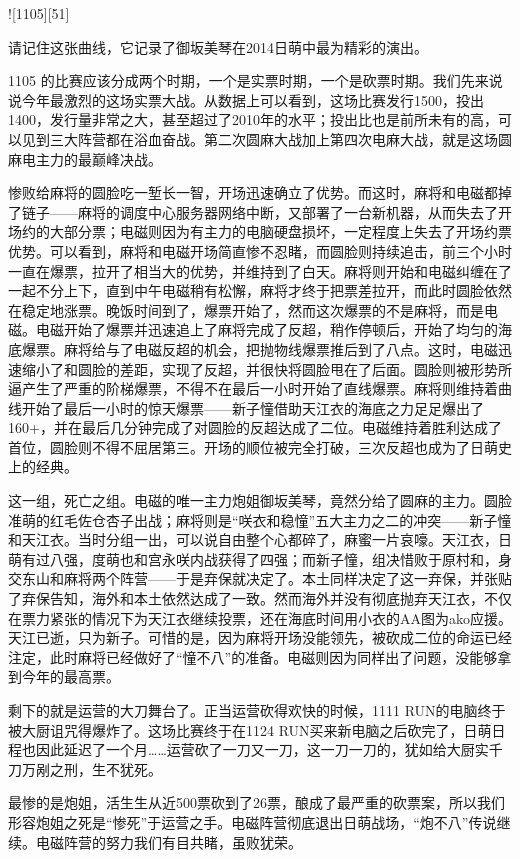 ![1105][51]

请记住这张曲线，它记录了御坂美琴在2014日萌中最为精彩的演出。

1105 的比赛应该分成两个时期，一个是实票时期，一个是砍票时期。我们先来说说今年最激烈的这场实票大战。从数据上可以看到，这场比赛发行1500，投出1400，发行量非常之大，甚至超过了2010年的水平；投出比也是前所未有的高，可以见到三大阵营都在浴血奋战。第二次圆麻大战加上第四次电麻大战，就是这场圆麻电主力的最巅峰决战。

惨败给麻将的圆脸吃一堑长一智，开场迅速确立了优势。而这时，麻将和电磁都掉了链子——麻将的调度中心服务器网络中断，又部署了一台新机器，从而失去了开场约的大部分票；电磁则因为有主力的电脑硬盘损坏，一定程度上失去了开场约票优势。可以看到，麻将和电磁开场简直惨不忍睹，而圆脸则持续追击，前三个小时一直在爆票，拉开了相当大的优势，并维持到了白天。麻将则开始和电磁纠缠在了一起不分上下，直到中午电磁稍有松懈，麻将才终于把票差拉开，而此时圆脸依然在稳定地涨票。晚饭时间到了，爆票开始了，然而这次爆票的不是麻将，而是电磁。电磁开始了爆票并迅速追上了麻将完成了反超，稍作停顿后，开始了均匀的海底爆票。麻将给与了电磁反超的机会，把抛物线爆票推后到了八点。这时，电磁迅速缩小了和圆脸的差距，实现了反超，并很快将圆脸甩在了后面。圆脸则被形势所逼产生了严重的阶梯爆票，不得不在最后一小时开始了直线爆票。麻将则维持着曲线开始了最后一小时的惊天爆票——新子憧借助天江衣的海底之力足足爆出了160+，并在最后几分钟完成了对圆脸的反超达成了二位。电磁维持着胜利达成了首位，圆脸则不得不屈居第三。开场的顺位被完全打破，三次反超也成为了日萌史上的经典。

这一组，死亡之组。电磁的唯一主力炮姐御坂美琴，竟然分给了圆麻的主力。圆脸准萌的红毛佐仓杏子出战；麻将则是“咲衣和稳憧”五大主力之二的冲突——新子憧和天江衣。当时分组一出，可以说自由整个心都碎了，麻蜜一片哀嚎。天江衣，日萌有过八强，度萌也和宫永咲内战获得了四强；而新子憧，组决惜败于原村和，身交东山和麻将两个阵营——于是弃保就决定了。本土同样决定了这一弃保，并张贴了弃保告知，海外和本土依然达成了一致。然而海外并没有彻底抛弃天江衣，不仅在票力紧张的情况下为天江衣继续投票，还在海底时间用小衣的AA图为ako应援。天江已逝，只为新子。可惜的是，因为麻将开场没能领先，被砍成二位的命运已经注定，此时麻将已经做好了“憧不八”的准备。电磁则因为同样出了问题，没能够拿到今年的最高票。

剩下的就是运营的大刀舞台了。正当运营砍得欢快的时候，1111 RUN的电脑终于被大厨诅咒得爆炸了。这场比赛终于在1124 RUN买来新电脑之后砍完了，日萌日程也因此延迟了一个月……运营砍了一刀又一刀，这一刀一刀的，犹如给大厨实千刀万剐之刑，生不犹死。

最惨的是炮姐，活生生从近500票砍到了26票，酿成了最严重的砍票案，所以我们形容炮姐之死是“惨死”于运营之手。电磁阵营彻底退出日萌战场，“炮不八”传说继续。电磁阵营的努力我们有目共睹，虽败犹荣。

